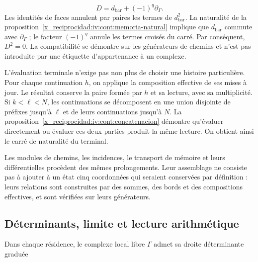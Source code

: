 \[
D=d_{\mathrm{bar}}+(-1)^q\partial_\Gamma.
\]
Les identités de faces annulent par paires les termes de \(d_{\mathrm{bar}}^2\). La naturalité de la proposition~\ref{x_reciprocidad:iv:cont:memoria-natural} implique que \(d_{\mathrm{bar}}\) commute avec \(\partial_\Gamma\) ; le facteur \((-1)^q\) annule les termes croisés du carré. Par conséquent, \(D^2=0\). La compatibilité se démontre sur les générateurs de chemins et n'est pas introduite par une étiquette d'appartenance à un complexe.

L'évaluation terminale n'exige pas non plus de choisir une histoire particulière. Pour chaque continuation \(h\), on applique la composition effective de ses mises à jour. Le résultat conserve la paire formée par \(h\) et sa lecture, avec sa multiplicité. Si \(k<\ell<N\), les continuations se décomposent en une union disjointe de préfixes jusqu'à \(\ell\) et de leurs continuations jusqu'à \(N\). La proposition~\ref{x_reciprocidad:iv:cont:concatenacion} démontre qu'évaluer directement ou évaluer ces deux parties produit la même lecture. On obtient ainsi le carré de naturalité du terminal.

Les modules de chemins, les incidences, le transport de mémoire et leurs différentielles procèdent des mêmes prolongements. Leur assemblage ne consiste pas à ajouter à un état cinq coordonnées qui seraient conservées par définition : leurs relations sont construites par des sommes, des bords et des compositions effectives, et sont vérifiées sur leurs générateurs.

\subsection{Déterminants, limite et lecture arithmétique}
\label{x_reciprocidad:iv:cont:determinantes}
Dans chaque résidence, le complexe local libre \(\Gamma\) admet sa droite déterminante graduée

